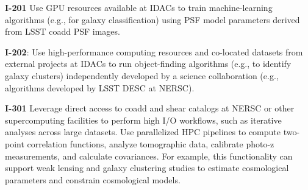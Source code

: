 \textbf{I-201}  Use GPU resources available at IDACs to train machine-learning algorithms (e.g., for galaxy classification) using PSF model parameters derived from LSST coadd PSF images.

\textbf{I-202}: Use high-performance computing resources and co-located datasets from external projects at IDACs to run object-finding algorithms (e.g., to identify galaxy clusters) independently developed by a science collaboration (e.g., algorithms developed by LSST DESC at NERSC).

\textbf{I-301} Leverage direct access to coadd and shear catalogs at NERSC or other supercomputing facilities to perform high I/O workflows, such as iterative analyses across large datasets.
Use parallelized HPC pipelines to compute two-point correlation functions, analyze tomographic data, calibrate photo-z measurements, and calculate covariances.
For example, this functionality can support weak lensing and galaxy clustering studies to estimate cosmological parameters and constrain cosmological models.
